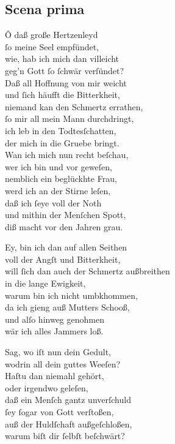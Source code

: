 \documentclass{ees}
\newenvironment{lyrics}[1]{%
  \subsection{#1}\nopagebreak%
  \begin{lyricslist}%
  \let\voice\item%
}{%
  \end{lyricslist}%
}
\begin{document}
\begin{lyrics}{Scena prima}
  \voice[Jobs Frau]
  Ô daß große Hertzenleyd\\
  ſo meine Seel empfündet,\\
  wie, hab ich mich dan villeicht\\
  geg’n Gott ſo ſchwär verſündet?\\
  Daß all Hoffnung von mir weicht\\
  und ſich häufft die Bitterkheit,\\
  niemand kan den Schmertz errathen,\\
  ſo mir all mein Mann durchdringt,\\
  ich leb in den Todtesſchatten,\\
  der mich in die Gruebe bringt.\\
  Wan ich mich nun recht beſchau,\\
  wer ich bin und vor geweſen,\\
  nemblich ein beglückhte Frau,\\
  werd ich an der Stirne leſen,\\
  daß ich ſeye voll der Noth\\
  und mithin der Menſchen Spott,\\
  diß macht vor den Jahren grau.

  \voice[Job]
  Ey, bin ich dan auf allen Seithen\\
  voll der Angſt und Bitterkheit,\\
  will ſich dan auch der Schmertz außbreithen\\
  in die lange Ewigkeit,\\
  warum bin ich nicht umbkhommen,\\
  da ich gieng auß Mutters Schooß,\\
  und alſo hinweg genohmen\\
  wär ich alles Jammers loß.

  \voice[Eliphas]
  Sag, wo iſt nun dein Gedult,\\
  wodrin all dein guttes Weeſen?\\
  Haſtu dan niemahl gehört,\\
  oder irgendwo geleſen,\\
  daß ein Menſch gantz unverſchuld\\
  ſey ſogar von Gott verſtoßen,\\
  auß der Huldſchaft außgeſchloßen,\\
  warum biſt dir ſelbſt beſchwärt?


\end{lyrics}
\end{document}
